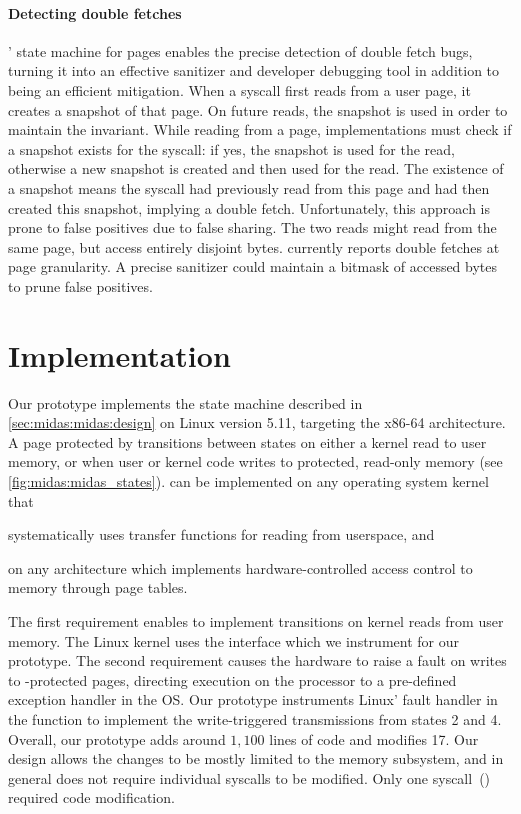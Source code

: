 \paragraph{Detecting double fetches}
\midas' state machine for pages enables the precise detection of double fetch
bugs, turning it into an effective sanitizer and developer debugging tool in
addition to being an efficient mitigation.
When a syscall first reads from a user page, it creates a snapshot
of that page.
On future reads, the snapshot is used in order to maintain the
invariant.
While reading from a page, implementations must check
if a snapshot exists for the syscall: if yes, the snapshot is used
for the read, otherwise a new snapshot is created and then used
for the read.
The existence of a snapshot means the syscall had previously
read from this page and had then created this snapshot, implying a double
fetch.
Unfortunately, this approach is prone to false positives due to false sharing.
The two reads might read from the same page, but access entirely
disjoint bytes.
\midas currently reports double fetches at page granularity.
A precise sanitizer could maintain a bitmask of accessed bytes to
prune false positives.


\section{\midas Implementation}
\label{sec:midas:midas:impl}

Our \midas prototype implements the state machine described in
\autoref{sec:midas:midas:design} on Linux version 5.11, targeting the x86-64
architecture.
A page protected by \midas transitions between states on
either a kernel read to user memory, or when user or kernel code
writes to protected, read-only memory (see \autoref{fig:midas:midas_states}).
\midas can be implemented on any operating system kernel that
\begin{inparaenum}
\item systematically uses transfer functions for reading from userspace, and
\item on any architecture which implements hardware-controlled access
control to memory through page tables.
\end{inparaenum}
The first requirement enables \midas to implement transitions on
kernel reads from user memory.
The Linux kernel uses the  interface which
we instrument for our prototype.
The second requirement causes the hardware to raise a fault on
writes to \midas-protected pages,
directing execution on the processor to a pre-defined exception
handler in the OS.
Our prototype instruments Linux' fault handler in the function
 to implement the write-triggered transmissions
from states 2 and 4.
Overall, our prototype adds around $1,100$ lines of code and modifies
17.
Our design allows the changes to be mostly limited to the memory
subsystem, and in general does not require individual syscalls to
be modified.
Only one syscall~() required code modification.


